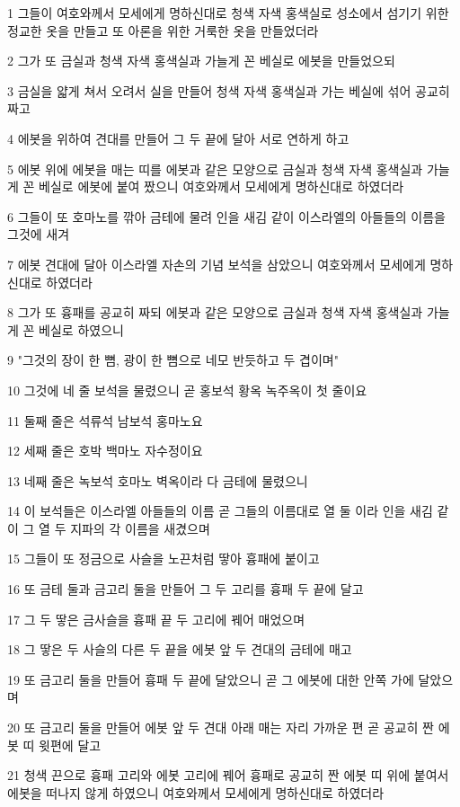 \par 1 그들이 여호와께서 모세에게 명하신대로 청색 자색 홍색실로 성소에서 섬기기 위한 정교한 옷을 만들고 또 아론을 위한 거룩한 옷을 만들었더라
\par 2 그가 또 금실과 청색 자색 홍색실과 가늘게 꼰 베실로 에봇을 만들었으되
\par 3 금실을 얇게 쳐서 오려서 실을 만들어 청색 자색 홍색실과 가는 베실에 섞어 공교히 짜고
\par 4 에봇을 위하여 견대를 만들어 그 두 끝에 달아 서로 연하게 하고
\par 5 에봇 위에 에봇을 매는 띠를 에봇과 같은 모양으로 금실과 청색 자색 홍색실과 가늘게 꼰 베실로 에봇에 붙여 짰으니 여호와께서 모세에게 명하신대로 하였더라
\par 6 그들이 또 호마노를 깎아 금테에 물려 인을 새김 같이 이스라엘의 아들들의 이름을 그것에 새겨
\par 7 에봇 견대에 달아 이스라엘 자손의 기념 보석을 삼았으니 여호와께서 모세에게 명하신대로 하였더라
\par 8 그가 또 흉패를 공교히 짜되 에봇과 같은 모양으로 금실과 청색 자색 홍색실과 가늘게 꼰 베실로 하였으니
\par 9 "그것의 장이 한 뼘, 광이 한 뼘으로 네모 반듯하고 두 겹이며"
\par 10 그것에 네 줄 보석을 물렸으니 곧 홍보석 황옥 녹주옥이 첫 줄이요
\par 11 둘째 줄은 석류석 남보석 홍마노요
\par 12 세째 줄은 호박 백마노 자수정이요
\par 13 네째 줄은 녹보석 호마노 벽옥이라 다 금테에 물렸으니
\par 14 이 보석들은 이스라엘 아들들의 이름 곧 그들의 이름대로 열 둘 이라 인을 새김 같이 그 열 두 지파의 각 이름을 새겼으며
\par 15 그들이 또 정금으로 사슬을 노끈처럼 땋아 흉패에 붙이고
\par 16 또 금테 둘과 금고리 둘을 만들어 그 두 고리를 흉패 두 끝에 달고
\par 17 그 두 땋은 금사슬을 흉패 끝 두 고리에 꿰어 매었으며
\par 18 그 땋은 두 사슬의 다른 두 끝을 에봇 앞 두 견대의 금테에 매고
\par 19 또 금고리 둘을 만들어 흉패 두 끝에 달았으니 곧 그 에봇에 대한 안쪽 가에 달았으며
\par 20 또 금고리 둘을 만들어 에봇 앞 두 견대 아래 매는 자리 가까운 편 곧 공교히 짠 에봇 띠 윗편에 달고
\par 21 청색 끈으로 흉패 고리와 에봇 고리에 꿰어 흉패로 공교히 짠 에봇 띠 위에 붙여서 에봇을 떠나지 않게 하였으니 여호와께서 모세에게 명하신대로 하였더라
